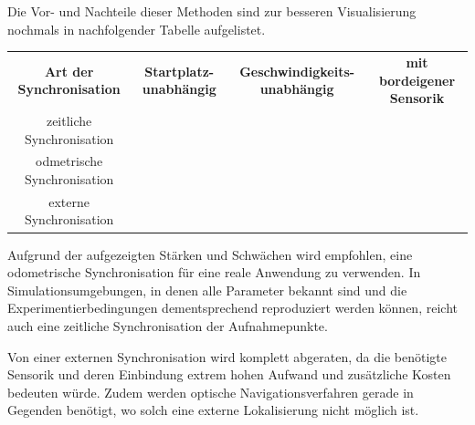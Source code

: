 \documentclass[12pt,a4paper,titlepage]{scrartcl}
\newcommand{\cmark}{\Large{\color{OliveGreen}\ding{51}}\normalsize}
\newcommand{\xmark}{\Large{\color{red}\ding{55}}\normalsize}
\begin{document}
Die Vor- und Nachteile dieser Methoden sind zur besseren Visualisierung nochmals in nachfolgender Tabelle aufgelistet.
\begin{table}[!htp]
\selectfont
\renewcommand{\tabularxcolumn}[1]{m{#1}} 
\label{tab:Synchro}
\centering
	\begin{tabularx}{1.0\textwidth}[t]{C|CCC}
	\textbf{Art der Synchronisation}	&	\textbf{Startplatz-unabhängig} & \textbf{Geschwindigkeits-unabhängig} & \textbf{mit bordeigener Sensorik}\tabularnewline
	zeitliche Synchronisation & \xmark & \xmark & \cmark \tabularnewline
	odmetrische Synchronisation & \xmark & \cmark & \cmark \tabularnewline
	externe Synchronisation & \cmark & \cmark & \xmark
	\end{tabularx}
\end{table}

Aufgrund der aufgezeigten Stärken und Schwächen wird empfohlen, eine odometrische Synchronisation für eine reale Anwendung zu verwenden. In Simulationsumgebungen, in denen alle Parameter bekannt sind und die Experimentierbedingungen dementsprechend reproduziert werden können, reicht auch eine zeitliche Synchronisation der Aufnahmepunkte. 

Von einer externen Synchronisation wird komplett abgeraten, da die benötigte Sensorik und deren Einbindung extrem hohen Aufwand und zusätzliche Kosten bedeuten würde. Zudem werden optische Navigationsverfahren gerade in Gegenden benötigt, wo solch eine externe Lokalisierung nicht möglich ist. 
%
%
%
\end{document}
